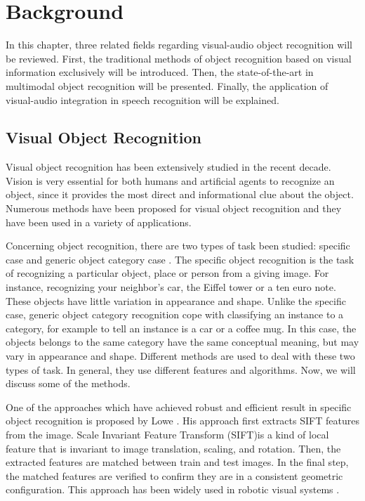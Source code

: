 \chapter{Background}\label{background}

In this chapter, three related fields regarding visual-audio object recognition will be reviewed. First, the traditional methods of object recognition based on visual information exclusively will be introduced. Then, the state-of-the-art in multimodal object recognition will be presented. Finally, the application of visual-audio integration in speech recognition will be explained.

\section{Visual Object Recognition}
Visual object recognition has been extensively studied in the recent decade. Vision is very essential for both humans and artificial agents to recognize an object, since it provides the most direct and informational clue about the object. Numerous methods have been proposed for visual object recognition and they have been used in a variety of applications.

Concerning object recognition, there are two types of task been studied: specific case and generic object category case \cite{grauman_visual_2011}. The specific object recognition is the task of recognizing a particular object, place or person from a giving image. For instance, recognizing your neighbor's car, the Eiffel tower or a ten euro note. These objects have little variation in appearance and shape. Unlike the specific case, generic object category recognition cope with classifying an instance to a category, for example to tell an instance is a car or a coffee mug. In this case, the objects belongs to the same category have the same conceptual meaning, but may vary in appearance and shape. Different methods are used to deal with these two types of task. In general, they use different features and algorithms. Now, we will discuss some of the methods.

One of the approaches which have achieved robust and efficient result in specific object recognition is proposed by Lowe \cite{lowe_object_1999}. His approach first extracts SIFT features from the image. Scale Invariant Feature Transform (SIFT)is a kind of local feature that is invariant to image translation, scaling, and rotation. Then, the extracted features are matched between train and test images. In the final step, the matched features are verified to confirm they are in a consistent geometric configuration. This approach has been widely used in robotic visual systems \cite{grauman_visual_2011}.

